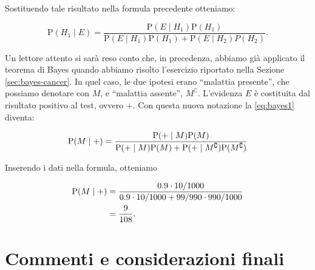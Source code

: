 \documentclass[
  11pt,
]{krantz}
\theoremstyle{definition}
\theoremstyle{definition}
\theoremstyle{definition}
\theoremstyle{definition}
\theoremstyle{remark}
\begin{document}
\noindent Sostituendo tale risultato nella formula precedente otteniamo:

\begin{equation}
{\mbox{P}}(H_1 \mid E) = \frac{{\mbox{P}}(E \mid H_1){\mbox{P}}(H_1)}{{\mbox{P}}(E \mid H_1){\mbox{P}}(H_1) + {\mbox{P}}(E \mid H_2)P(H_2)}.
\label{eq:bayes1}
\end{equation}

Un lettore attento si sarà reso conto che, in precedenza, abbiamo già applicato il teorema di Bayes quando abbiamo risolto l'esercizio riportato nella Sezione \ref{sec:bayes-cancer}. In quel caso, le due ipotesi erano ``malattia presente'', che possiamo denotare con \(M\), e ``malattia assente'', \(M^\complement\). L'evidenza \(E\) è costituita dal risultato positivo al test, ovvero \(+\). Con questa nuova notazione la \eqref{eq:bayes1} diventa:

\begin{equation}
{\mbox{P}}(M \mid +) = \frac{{\mbox{P}}(+ \mid M) {\mbox{P}}(M)}{{\mbox{P}}(+ \mid M) {\mbox{P}}(M) + {\mbox{P}}(+ \mid M^\complement) {\mbox{P}}(M^\complement)}\notag
\end{equation}

Inserendo i dati nella formula, otteniamo

\begin{align}
{\mbox{P}}(M \mid +) &= \frac{0.9 \cdot 10/1000}{0.9 \cdot 10/1000 + 99 / 990 \cdot 990 / 1000} \notag\\
&= \frac{9}{108}.\notag
\end{align}

\hypertarget{commenti-e-considerazioni-finali-2}{%
\section*{Commenti e considerazioni finali}\label{commenti-e-considerazioni-finali-2}}
\end{document}
